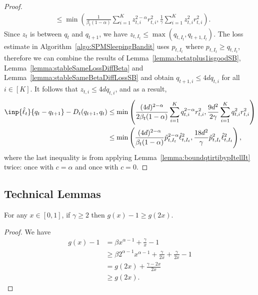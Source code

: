 \begin{proof}
\begin{align}
        &\leq  \min\left(\frac{1}{\beta_t(1-\alpha)}\sum_{i=1}^{K} z_{t,i}^{2-\alpha}r_{t,i}^2, \frac{1}{\gamma}\sum_{i=1}^K z_{t,i}^2 r_{t,i}^2 \right).
    \end{align}
    Since $z_t$ is between $q_{t}$ and $q_{t+1}$, we have $z_{t,I_t} \leq \max(q_{t, I_t}, q_{t+1,I_t})$. 
    The loss estimate in Algorithm~\ref{algo:SPMSleepingBandit} uses $p_{t,I_t}$ where $p_{t,I_t} \geq q_{t,I_t}$, therefore we can combine the results of Lemma~\ref{lemma:betatplus1isgoodSB}, Lemma~\ref{lemma:stableSameLossDiffBeta} and Lemma~\ref{lemma:stableSameBetaDiffLossSB} and obtain $q_{t+1, i} \leq 4dq_{t,i}$ for all $i \in [K]$. It follows that $z_{t, i} \leq 4dq_{t,i}$, and as a result,
    \begin{align}
        \inp{\hat{\ell}_t}{q_{t}  - q_{t+1}} - D_t(q_{t+1}, q_t) &\leq \min\left(\frac{(4d)^{2-\alpha}}{2\beta_t(1-\alpha)} \sum_{i=1}^K q_{t,i}^{2-\alpha}r_{t,i}^2, \frac{9d^2}{2\gamma} \sum_{i=1}^K q_{t,i}^2 r_{t,i}^2 \right) \\
        &\leq \min\left( \frac{(4d)^{2-\alpha}}{\beta_t(1-\alpha)}\tilde{p}_{t,I_t}^{2-\alpha}\hat{\ell}^2_{t,I_t}, \frac{18d^2}{\gamma} \tilde{p}_{t,I_t}^2 \hat{\ell}_{t,I_t}^2  \right),
    \end{align}
    where the last inequality is from applying Lemma~\ref{lemma:boundqtirtibypItellIt} twice: once with $c = \alpha$ and once with $c = 0$.
\end{proof}

\subsection{Technical Lemmas}
\begin{lemma}
  For any $x \in [0,1]$, if $\gamma \geq 2$ then $g(x) - 1 \geq g(2x)$.
  \label{lemma:gxminus1Largerg2x}
\end{lemma}
\begin{proof}
  We have
  \begin{align*}
      g(x) - 1 &= \beta x^{\alpha-1} + \frac{\gamma}{x} - 1 \\
      &\geq \beta 2^{\alpha-1}x^{\alpha-1} + \frac{\gamma}{2x} + \frac{\gamma}{2x} - 1 \\
      &= g(2x) + \frac{\gamma - 2x}{2x} \\
      &\geq g(2x).
  \end{align*}
\end{proof}


